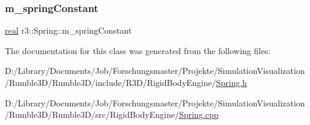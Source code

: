 \subsubsection{\texorpdfstring{m\+\_\+spring\+Constant}{m\_springConstant}}
{\footnotesize\ttfamily \mbox{\hyperlink{namespacer3_ab2016b3e3f743fb735afce242f0dc1eb}{real}} r3\+::\+Spring\+::m\+\_\+spring\+Constant\hspace{0.3cm}{\ttfamily [protected]}}



The documentation for this class was generated from the following files\+:\begin{DoxyCompactItemize}
\item 
D\+:/\+Library/\+Documents/\+Job/\+Forschungsmaster/\+Projekte/\+Simulation\+Visualization/\+Rumble3\+D/\+Rumble3\+D/include/\+R3\+D/\+Rigid\+Body\+Engine/\mbox{\hyperlink{_spring_8h}{Spring.\+h}}\item 
D\+:/\+Library/\+Documents/\+Job/\+Forschungsmaster/\+Projekte/\+Simulation\+Visualization/\+Rumble3\+D/\+Rumble3\+D/src/\+Rigid\+Body\+Engine/\mbox{\hyperlink{_spring_8cpp}{Spring.\+cpp}}\end{DoxyCompactItemize}
